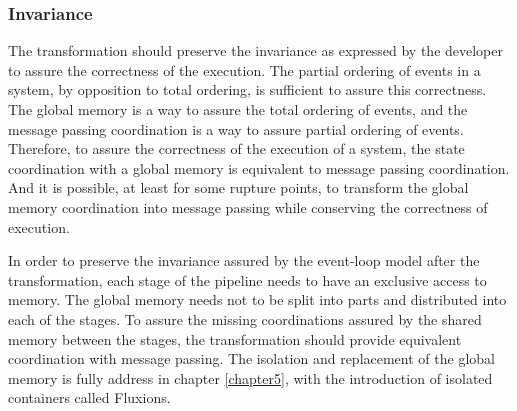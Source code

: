 \subsubsection{Invariance}


The transformation should preserve the invariance as expressed by the developer to assure the correctness of the execution.
The partial ordering of events in a system, by opposition to total ordering, is sufficient to assure this correctness.
The global memory is a way to assure the total ordering of events, and the message passing coordination is a way to assure partial ordering of events.
Therefore, to assure the correctness of the execution of a system, the state coordination with a global memory is equivalent to message passing coordination.
And it is possible, at least for some rupture points, to transform the global memory coordination into message passing while conserving the correctness of execution.

In order to preserve the invariance assured by the event-loop model after the transformation, each stage of the pipeline needs to have an exclusive access to memory.
The global memory needs not to be split into parts and distributed into each of the stages.
To assure the missing coordinations assured by the shared memory between the stages, the transformation should provide equivalent coordination with message passing.
The isolation and replacement of the global memory is fully address in chapter \ref{chapter5}, with the introduction of isolated containers called Fluxions.






